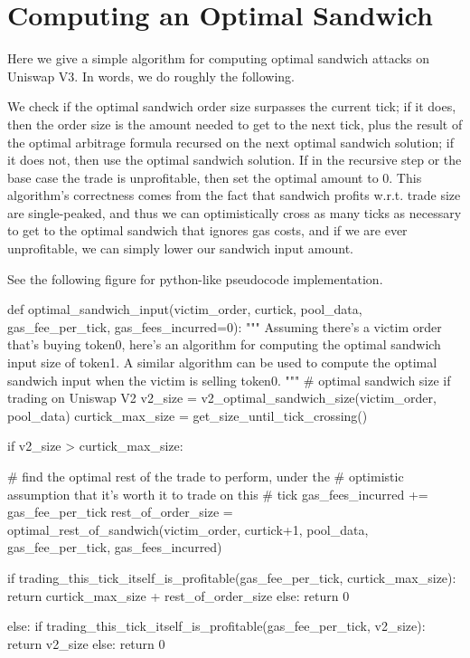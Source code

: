 \section{Computing an Optimal Sandwich} \label{appendix:opt-sandwich}

Here we give a simple algorithm for computing optimal sandwich attacks on Uniswap V3. In words, we do roughly the following.

We check if the optimal sandwich order size surpasses the current tick; if it does, then the order size is the amount needed to get to the next tick, plus the result of the optimal arbitrage formula recursed on the next optimal sandwich solution; if it does not, then use the optimal sandwich solution. If in the recursive step or the base case the trade is unprofitable, then set the optimal amount to 0. This algorithm's correctness comes from the fact that sandwich profits w.r.t. trade size are single-peaked, and thus we can optimistically cross as many ticks as necessary to get to the optimal sandwich that ignores gas costs, and if we are ever unprofitable, we can simply lower our sandwich input amount.

See the following figure for python-like pseudocode implementation.

\label{fig:python-pseudocode}
\begin{python}
    def optimal_sandwich_input(victim_order, curtick, pool_data, gas_fee_per_tick, gas_fees_incurred=0):
        """
        Assuming there's a victim order that's buying token0, here's
        an algorithm for computing the optimal sandwich input size of
        token1. A similar algorithm can be used to compute the optimal
        sandwich input when the victim is selling token0.
        """
        # optimal sandwich size if trading on Uniswap V2
        v2_size = v2_optimal_sandwich_size(victim_order, pool_data)
        curtick_max_size = get_size_until_tick_crossing()
        
        if v2_size > curtick_max_size:

            # find the optimal rest of the trade to perform, under the 
            # optimistic assumption that it's worth it to trade on this 
            # tick
            gas_fees_incurred += gas_fee_per_tick
            rest_of_order_size = optimal_rest_of_sandwich(victim_order, curtick+1, pool_data, gas_fee_per_tick, gas_fees_incurred)
            
            if trading_this_tick_itself_is_profitable(gas_fee_per_tick, curtick_max_size):
                return curtick_max_size + rest_of_order_size
            else:
            return 0
            
        else:
            if trading_this_tick_itself_is_profitable(gas_fee_per_tick, v2_size):
            return v2_size
            else:
                return 0
\end{python}